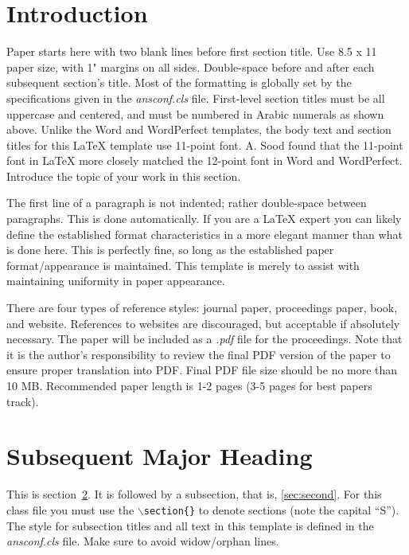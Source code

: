 \documentclass{ansconf}
\begin{document}
\begin{multicols}{2}

\section{Introduction}

Paper starts here with two blank lines before first section title.  Use 
8.5 x 11 paper size, with 1" margins on all sides.  Double-space before and
after each subsequent section's title.  Most of the formatting is globally
set by the specifications given in the {\it ansconf.cls} file.  
First-level section titles must be all uppercase and centered, and must 
be numbered in Arabic numerals as shown above.  Unlike the Word and WordPerfect
templates, the body text and section titles for this {\LaTeX} template use 
11-point font.  A. Sood found that the 11-point font in {\LaTeX} more closely 
matched the 12-point font in Word and WordPerfect.  Introduce the topic of 
your work in this section.

The first line of a paragraph is not indented; rather double-space between 
paragraphs.  This is done automatically. If you are a {\LaTeX} expert you 
can likely define the established format characteristics in a more elegant 
manner than what is done here.  This is perfectly fine, so long as the 
established paper format/appearance is maintained.  This template is merely 
to assist with maintaining uniformity in paper appearance.

There are four types of reference styles: journal paper\cite{journal},
proceedings paper\cite{proc_paper}, book\cite{book}, and website\cite{techrep}.
References to websites are discouraged, but acceptable if absolutely necessary.
The paper will be included as a {\it .pdf} file for the proceedings. Note that
it is the author's responsibility to review the final PDF version of the paper
to ensure proper translation into PDF.  Final PDF file size should be no more
than 10 MB. Recommended paper length is 1-2 pages (3-5 pages for best papers track).

\section{Subsequent Major Heading}
\label{sec:first}

This is section~\ref{sec:first}. It is followed by a subsection, that is, 
\ref{sec:second}. For this class file you must use the 
\texttt{$\backslash$section\{\}} to denote sections (note the capital ``S'').  
The style for subsection titles and all text in this template is defined in 
the {\it ansconf.cls} file.  Make sure to avoid widow/orphan lines.



\end{multicols}
\end{document}
